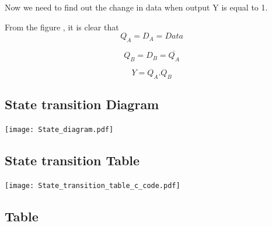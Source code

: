 \documentclass{article}
\begin{document}
 Now we need to find out the change in data when output Y is equal to 1.

 From the figure , it is clear that
 \begin{equation}
     Q_A = D_A = Data 
\end{equation}

 \begin{equation}
    Q_B = D_B = \overline{Q_A}
\end{equation}

\begin{equation}
     Y = Q_A.Q_B
\end{equation}
 \subsection{State transition Diagram}
 \begin{center}
    \texttt{[image: State\_diagram.pdf]}
\end{center}

\subsection{State transition Table}
\begin{center}
    \texttt{[image: State\_transition\_table\_c\_code.pdf]}
\end{center}
\subsection{Table} 
\end{document}
